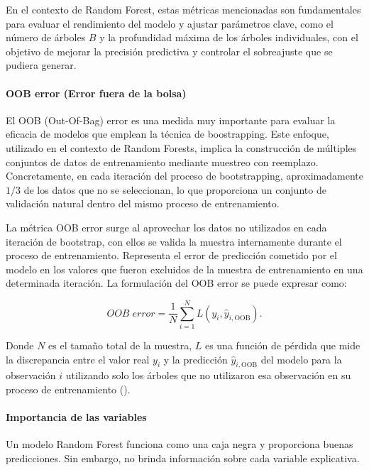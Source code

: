 En el contexto de Random Forest, estas métricas mencionadas son fundamentales para evaluar el rendimiento del modelo y ajustar parámetros clave, como el número de árboles \(B\) y la profundidad máxima de los árboles individuales, con el objetivo de mejorar la precisión predictiva y controlar el sobreajuste que se pudiera generar.



\paragraph{OOB error (Error fuera de la bolsa)}\label{sec:oob}

El OOB (Out-Of-Bag) error es una medida muy importante para evaluar la eficacia de modelos que emplean la técnica de boostrapping. Este enfoque,  utilizado en el contexto de Random Forests, implica la construcción de múltiples conjuntos de datos de entrenamiento mediante muestreo con reemplazo. Concretamente, en cada iteración del proceso de bootstrapping, aproximadamente \(1/3\) de los datos que no se seleccionan, lo que proporciona un conjunto de validación natural dentro del mismo proceso de entrenamiento. 

La métrica OOB error surge al aprovechar los datos no utilizados en cada iteración de bootstrap, con ellos se valida la muestra internamente durante el proceso de entrenamiento. Representa el error de predicción cometido por el modelo en los valores que fueron excluidos de la muestra de entrenamiento en una determinada iteración. La formulación del OOB error se puede expresar como:

\[
OOB\; error = \frac{1}{N} \sum_{i=1}^{N} L(y_i, \hat{y}_{i,\text{OOB}})
.\]

Donde \(N\) es el tamaño total de la muestra, \(L\) es una función de pérdida que mide la discrepancia entre el valor real \(y_i\) y la predicción \(\hat{y}_{i,\text{OOB}}\) del modelo para la observación \(i\) utilizando solo los árboles que no utilizaron esa observación en su proceso de entrenamiento (\cite{james2013introduction}).


\paragraph{Importancia de las variables}\label{sec:importancia-variables}

Un modelo Random Forest funciona como una caja negra y proporciona buenas predicciones. Sin embargo, no brinda información sobre cada variable explicativa.

